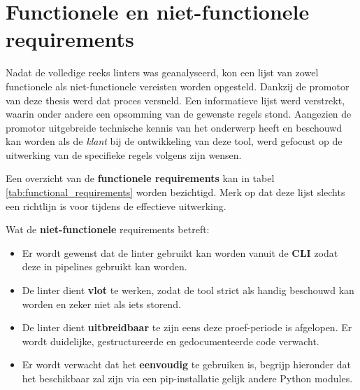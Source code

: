 \section{Functionele en niet-functionele requirements}
Nadat de volledige reeks linters was geanalyseerd, kon een lijst van zowel functionele als niet-functionele vereisten worden opgesteld. Dankzij de promotor van deze thesis werd dat proces versneld. Een informatieve lijst werd verstrekt, waarin onder andere een opsomming van de gewenste regels stond. Aangezien de promotor uitgebreide technische kennis van het onderwerp heeft en beschouwd kan worden als de \emph{klant} bij de ontwikkeling van deze tool, werd gefocust op de uitwerking van de specifieke regels volgens zijn wensen.\newline

Een overzicht van de \textbf{functionele requirements} kan in tabel \ref{tab:functional_requirements} worden bezichtigd. Merk op dat deze lijst slechts een richtlijn is voor tijdens de effectieve uitwerking.\newline

Wat de \textbf{niet-functionele} requirements betreft:
\begin{itemize}
    \item Er wordt gewenst dat de linter gebruikt kan worden vanuit de \textbf{CLI} zodat deze in pipelines gebruikt kan worden.
    \item De linter dient \textbf{vlot} te werken, zodat de tool strict als handig beschouwd kan worden en zeker niet als iets storend.
    \item De linter dient \textbf{uitbreidbaar} te zijn eens deze proef-periode is afgelopen. Er wordt duidelijke, gestructureerde en gedocumenteerde code verwacht.
    \item Er wordt verwacht dat het \textbf{eenvoudig} te gebruiken is, begrijp hieronder dat het beschikbaar zal zijn via een pip-installatie gelijk andere Python modules.
\end{itemize}

